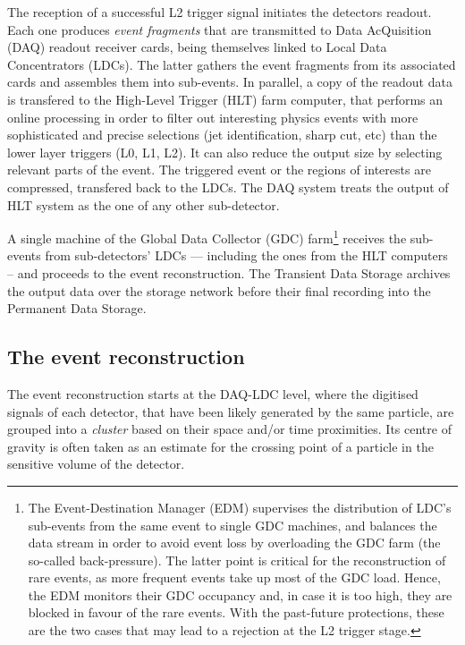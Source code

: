 The reception of a successful L2 trigger signal initiates the detectors readout. Each one produces \textit{event fragments} that are transmitted to Data AcQuisition (DAQ) readout receiver cards, being themselves linked to Local Data Concentrators (LDCs). The latter gathers the event fragments from its associated cards and assembles them into sub-events. In parallel, a copy of the readout data is transfered to the High-Level Trigger (HLT) farm computer, that performs an online processing in order to filter out interesting physics events with more sophisticated and precise selections (jet identification, sharp \pT cut, etc) than the lower layer triggers (L0, L1, L2). It can also reduce the output size by selecting relevant parts of the event. The triggered event or the regions of interests are compressed, transfered back to the LDCs. The DAQ system treats the output of HLT system as the one of any other sub-detector.

A single machine of the Global Data Collector (GDC) farm\footnote{The Event-Destination Manager (EDM) supervises the distribution of LDC's sub-events from the same event to single GDC machines, and balances the data stream in order to avoid event loss by overloading the GDC farm (the so-called back-pressure). The latter point is critical for the reconstruction of rare events, as more frequent events take up most of the GDC load. Hence, the EDM monitors their GDC occupancy and, in case it is too high, they are blocked in favour of the rare events. With the past-future protections, these are the two cases that may lead to a rejection at the L2 trigger stage.} receives the sub-events from sub-detectors' LDCs --- including the ones from the HLT computers -- and proceeds to the event reconstruction. The Transient Data Storage archives the output data over the storage network before their final recording into the Permanent Data Storage.


\subsection{The event reconstruction}
\label{subsec:EventReco}

The event reconstruction starts at the DAQ-LDC level, where the digitised signals of each detector, that have been likely generated by the same particle, are grouped into a \textit{cluster} based on their space and/or time proximities. Its centre of gravity is often taken as an estimate for the crossing point of a particle in the sensitive volume of the detector.

